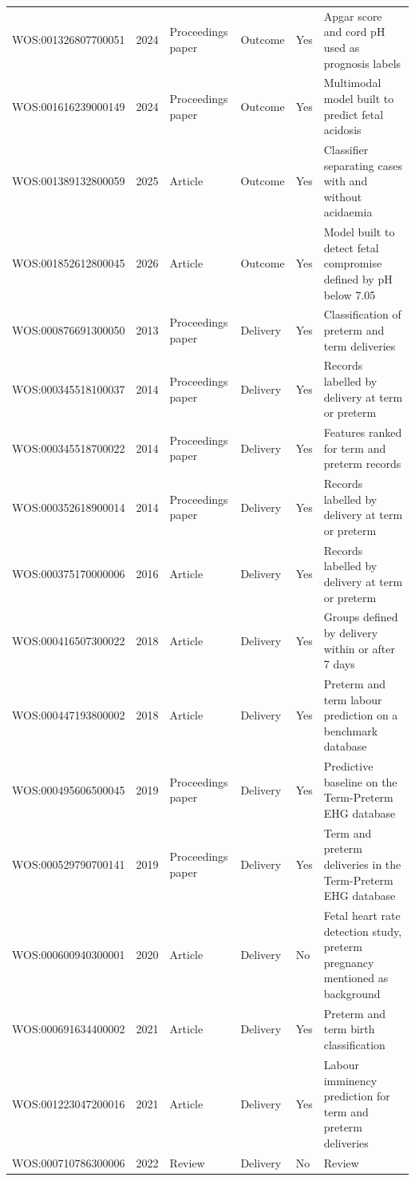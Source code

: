 \begin{longtable}{@{}p{3.5cm}rlllp{5.2cm}@{}}
WOS:001326807700051 & 2024 & Proceedings paper & Outcome & Yes & Apgar score and cord pH used as prognosis labels \\
WOS:001616239000149 & 2024 & Proceedings paper & Outcome & Yes & Multimodal model built to predict fetal acidosis \\
WOS:001389132800059 & 2025 & Article & Outcome & Yes & Classifier separating cases with and without acidaemia \\
WOS:001852612800045 & 2026 & Article & Outcome & Yes & Model built to detect fetal compromise defined by pH below 7.05 \\
WOS:000876691300050 & 2013 & Proceedings paper & Delivery & Yes & Classification of preterm and term deliveries \\
WOS:000345518100037 & 2014 & Proceedings paper & Delivery & Yes & Records labelled by delivery at term or preterm \\
WOS:000345518700022 & 2014 & Proceedings paper & Delivery & Yes & Features ranked for term and preterm records \\
WOS:000352618900014 & 2014 & Proceedings paper & Delivery & Yes & Records labelled by delivery at term or preterm \\
WOS:000375170000006 & 2016 & Article & Delivery & Yes & Records labelled by delivery at term or preterm \\
WOS:000416507300022 & 2018 & Article & Delivery & Yes & Groups defined by delivery within or after 7 days \\
WOS:000447193800002 & 2018 & Article & Delivery & Yes & Preterm and term labour prediction on a benchmark database \\
WOS:000495606500045 & 2019 & Proceedings paper & Delivery & Yes & Predictive baseline on the Term-Preterm EHG database \\
WOS:000529790700141 & 2019 & Proceedings paper & Delivery & Yes & Term and preterm deliveries in the Term-Preterm EHG database \\
WOS:000600940300001 & 2020 & Article & Delivery & No & Fetal heart rate detection study, preterm pregnancy mentioned as background \\
WOS:000691634400002 & 2021 & Article & Delivery & Yes & Preterm and term birth classification \\
WOS:001223047200016 & 2021 & Article & Delivery & Yes & Labour imminency prediction for term and preterm deliveries \\
WOS:000710786300006 & 2022 & Review & Delivery & No & Review \\

\end{longtable}
